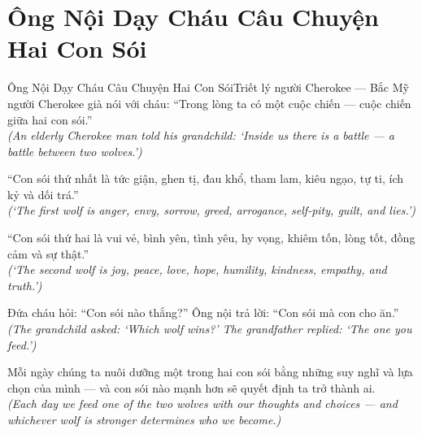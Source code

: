 \section{Ông Nội Dạy Cháu Câu Chuyện Hai Con Sói}
\begin{truyen}{Ông Nội Dạy Cháu Câu Chuyện Hai Con Sói}{Triết lý người Cherokee --- Bắc Mỹ}
 người Cherokee già nói với cháu: ``Trong lòng ta có một cuộc chiến --- cuộc chiến giữa hai con sói.''\\[4pt]
\textit{(An elderly Cherokee man told his grandchild: `Inside us there is a battle --- a battle between two wolves.')}

``Con sói thứ nhất là tức giận, ghen tị, đau khổ, tham lam, kiêu ngạo, tự ti, ích kỷ và dối trá.''\\[4pt]
\textit{(`The first wolf is anger, envy, sorrow, greed, arrogance, self-pity, guilt, and lies.')}

``Con sói thứ hai là vui vẻ, bình yên, tình yêu, hy vọng, khiêm tốn, lòng tốt, đồng cảm và sự thật.''\\[4pt]
\textit{(`The second wolf is joy, peace, love, hope, humility, kindness, empathy, and truth.')}

Đứa cháu hỏi: ``Con sói nào thắng?'' Ông nội trả lời: ``Con sói mà con cho ăn.''\\[4pt]
\textit{(The grandchild asked: `Which wolf wins?' The grandfather replied: `The one you feed.')}

\end{truyen}
\begin{baihoc}
  Mỗi ngày chúng ta nuôi dưỡng một trong hai con sói bằng những suy nghĩ và lựa chọn của mình --- và con sói nào mạnh hơn sẽ quyết định ta trở thành ai.\\[4pt]
  \textit{(Each day we feed one of the two wolves with our thoughts and choices --- and whichever wolf is stronger determines who we become.)}
\end{baihoc}

